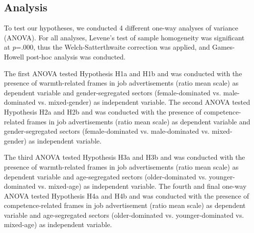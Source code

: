 \documentclass[Royal,sageapa,times]{sagej}
\begin{document}
\subsection{Analysis}
\label{analysis}
To test our hypotheses, we conducted 4 different one-way analyses of variance (ANOVA). For all analyses, Levene’s test of sample homogeneity was significant at \textit{p}=.000, thus the Welch-Satterthwaite correction was applied, and Games-Howell post-hoc analysis was conducted.

The first ANOVA tested Hypothesis H1a and H1b and was conducted with the presence of warmth-related frames in job advertisements (ratio mean scale) as dependent variable and gender-segregated sectors (female-dominated vs. male-dominated vs. mixed-gender) as independent variable. The second ANOVA tested Hypothesis H2a and H2b and was conducted with the presence of competence-related frames in job advertisements (ratio mean scale) as dependent variable and gender-segregated sectors (female-dominated vs. male-dominated vs. mixed-gender) as independent variable.

The third ANOVA tested Hypothesis H3a and H3b and was conducted with the presence of warmth-related frames in job advertisements (ratio mean scale) as dependent variable and age-segregated sectors (older-dominated vs. younger-dominated vs. mixed-age) as independent variable. The fourth and final one-way ANOVA tested Hypothesis H4a and H4b and was conducted with the presence of competence-related frames in job advertisement (ratio mean scale) as dependent variable and age-segregated sectors (older-dominated vs. younger-dominated vs. mixed-age) as independent variable.

\end{document}
